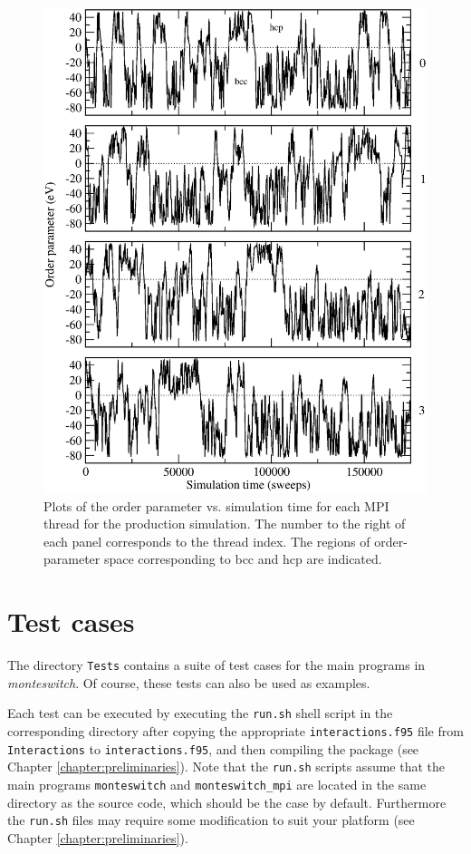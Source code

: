 \documentclass{report}
\begin{document}
\begin{figure}
\centering
\includegraphics[width=\textwidth]{production_results}
\caption
{Plots of the order parameter vs. simulation time for each MPI thread for the production simulation. The number to the right of each panel corresponds
to the thread index. The regions of order-parameter space corresponding to bcc and hcp are indicated.}
\label{fig:production_results}
\end{figure}



\chapter{Test cases}\label{chapter:tests}
The directory \texttt{Tests} contains a suite of test cases for the main programs in \emph{monteswitch}. Of course, these tests can also be used as
examples.

Each test can be executed by executing the \texttt{run.sh} shell script in the corresponding directory after copying the
appropriate \texttt{interactions.f95} file from \texttt{Interactions} to \texttt{interactions.f95}, and then compiling the
package (see Chapter \ref{chapter:preliminaries}). Note that the \texttt{run.sh} scripts assume that the main programs \texttt{monteswitch}
and \texttt{monteswitch\_mpi} are located in the same directory as the source code, which should be the case by default. Furthermore
the \texttt{run.sh} files may require some modification to suit your platform (see Chapter \ref{chapter:preliminaries}).
\end{document}
